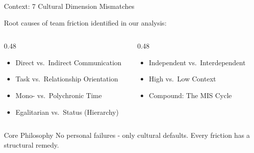 \documentclass[aspectratio=169, 12pt]{beamer}
\newcommand{\presenter}[1]{\gdef\currentpresenter{#1}}
\gdef\currentpresenter{}
\begin{document}
\begin{frame}{Context: 7 Cultural Dimension Mismatches}
\presenter{Presenter: Arihant JAIN}

\vspace{0.3em}

Root causes of team friction identified in our analysis:

\vspace{0.3em}

\begin{columns}[T]
\begin{column}{0.48\textwidth}
\begin{itemize}
    \item Direct vs.\ Indirect Communication
    \item Task vs.\ Relationship Orientation
    \item Mono- vs.\ Polychronic Time
    \item Egalitarian vs.\ Status (Hierarchy)
\end{itemize}
\end{column}
\begin{column}{0.48\textwidth}
\begin{itemize}
    \item Independent vs.\ Interdependent
    \item High vs.\ Low Context
    \item Compound: The \alert{MIS Cycle}
\end{itemize}
\end{column}
\end{columns}

\vspace{0.8em}

\begin{block}{Core Philosophy}
No personal failures - only cultural defaults. Every friction has a structural remedy.
\end{block}

\end{frame}
\end{document}
